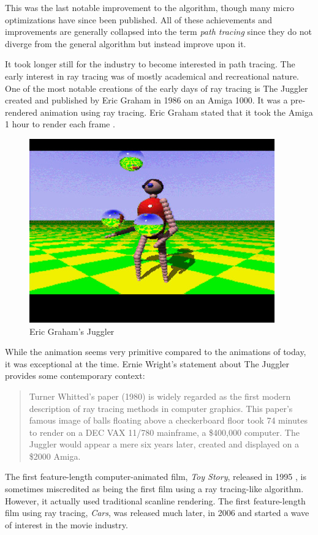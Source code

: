 \documentclass[
  twoside,
  11pt, a4paper,
  footinclude=true,
  headinclude=true,
  cleardoublepage=empty
]{scrreprt}
\begin{document}
This was the last notable improvement to the algorithm,
though many micro optimizations have since been published. All of these achievements and
improvements are generally collapsed into the term \emph{path tracing} since they do not diverge
from the general algorithm but instead improve upon it.

It took longer still for the industry to become interested in path tracing. The early interest in
ray tracing was of mostly academical and recreational nature. One of the most notable creations of
the early days of ray tracing is The Juggler created and published by Eric Graham in 1986
\cite{site:juggler} on an Amiga 1000. It was a pre-rendered animation using ray tracing. Eric Graham
stated that it took the Amiga 1 hour to render each frame \cite{site:juggler}.

\begin{figure}[H]
    \includegraphics[scale=0.5]{amiga-juggler}
    \centering
    \caption{Eric Graham's Juggler}
    \label{fig:amiga-juggler}
\end{figure}
While the animation seems very primitive compared to the animations of today, it was exceptional at
the time. Ernie Wright's statement about The Juggler provides some contemporary context:

\blockquote[\cite{site:juggler}]{Turner Whitted's paper (1980) is widely regarded as the first modern
description of ray tracing methods in computer graphics. This paper's famous image of balls floating
above a checkerboard floor took 74 minutes to render on a DEC VAX 11/780 mainframe, a \$400,000
computer. The Juggler would appear a mere six years later, created and displayed on a \$2000 Amiga.}

The first feature-length computer-animated film,
\textit{Toy Story}, released in 1995 \cite{wiki:toy-story}, is sometimes miscredited as being the
first film using a ray tracing-like algorithm. However, it actually used traditional scanline
rendering. The first feature-length film using ray tracing, \textit{Cars}, was released much later,
in 2006 \cite{wiki:cars} \cite{inproceedings:cars} and started a wave of interest in the movie industry.
\end{document}

